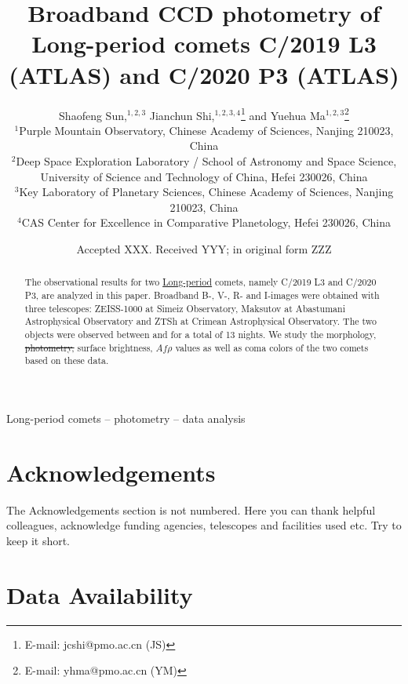\documentclass[fleqn,usenatbib]{mnras}
\title[CCD photometry of C/2019 L3 and C/2020 P3]{Broadband CCD photometry of Long-period comets C/2019 L3 (ATLAS) and C/2020 P3 (ATLAS)}
\author[Shaofeng Sun et al.]{
Shaofeng Sun,$^{1, 2, 3}$
Jianchun Shi,$^{1, 2, 3, 4}$\thanks{E-mail: jcshi@pmo.ac.cn (JS)}
and Yuehua Ma$^{1, 2, 3}$\thanks{E-mail: yhma@pmo.ac.cn (YM)}
\\
$^{1}$Purple Mountain Observatory, Chinese Academy of Sciences, Nanjing 210023, China\\
$^{2}$Deep Space Exploration Laboratory / School of Astronomy and Space Science, University of Science and Technology of China, Hefei 230026, China\\
$^{3}$Key Laboratory of Planetary Sciences, Chinese Academy of Sciences, Nanjing 210023, China\\
$^{4}$CAS Center for Excellence in Comparative Planetology, Hefei 230026, China
}
\date{Accepted XXX. Received YYY; in original form ZZZ}
\begin{document}
\label{firstpage}
\pagerange{\pageref{firstpage}--\pageref{lastpage}}
\maketitle


\begin{abstract}
	The observational results for two \ul{Long-period} comets, namely C/2019 L3 and C/2020 P3, are analyzed in this paper. 
	Broadband B-, V-, R- and I-images were obtained with three telescopes: ZEISS-1000 at Simeiz Observatory, Maksutov at Abastumani Astrophysical Observatory and ZTSh at Crimean Astrophysical Observatory. 
	The two objects were observed between  and  for a total of 13 nights. 
	We study the morphology, \st{photometry, }surface brightness, $Af\rho$ values as well as coma colors of the two comets based on these data. 
\end{abstract}

\begin{keywords}
Long-period comets -- photometry -- data analysis
\end{keywords}














\section*{Acknowledgements}

The Acknowledgements section is not numbered. Here you can thank helpful
colleagues, acknowledge funding agencies, telescopes and facilities used etc.
Try to keep it short.

\section*{Data Availability}
\end{document}
